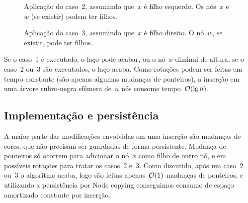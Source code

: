 \documentclass[../../main.tex]{subfiles}
\begin{document}
\begin{figure}
\centering
{}
\caption{Aplicação do caso~2, assumindo que~$x$ é filho esquerdo. Os nós~$x$ e~$w$ (se existir) podem ter filhos.} \label{fig:rb_ins_caso2}
\end{figure}

\begin{figure}
\centering
{}
\caption{Aplicação do caso~3, assumindo que~$x$ é filho direito. O nó~$w$, se existir, pode ter filhos.} \label{fig:rb_ins_caso3}
\end{figure}

Se o caso~1 é executado, o laço pode acabar, ou o nó~$x$ diminui de altura, se o caso~2 ou~3 são executados, o laço acaba. Como rotações podem ser feitas em tempo constante (são apenas algumas mudanças de ponteiros), a inserção em uma árvore rubro-negra efêmera de~$n$ nós consome tempo~$\mathcal{O}(\lg n)$.

\subsection{Implementação e persistência}

A maior parte das modificações envolvidas em uma inserção são mudanças de cores, que não precisam ser guardadas de forma persistente. Mudança de ponteiros só ocorrem para adicionar o nó~$x$ como filho de outro nó, e em possíveis rotações para tratar os casos~2 e~3. Como discutido, após um caso~2 ou~3 o algoritmo acaba, logo são feitas apenas~$\mathcal{O}(1)$ mudanças de ponteiros, e utilizando a persistência por Node copying conseguimos consumo de espaço amortizado constante por inserção.
\end{document}
